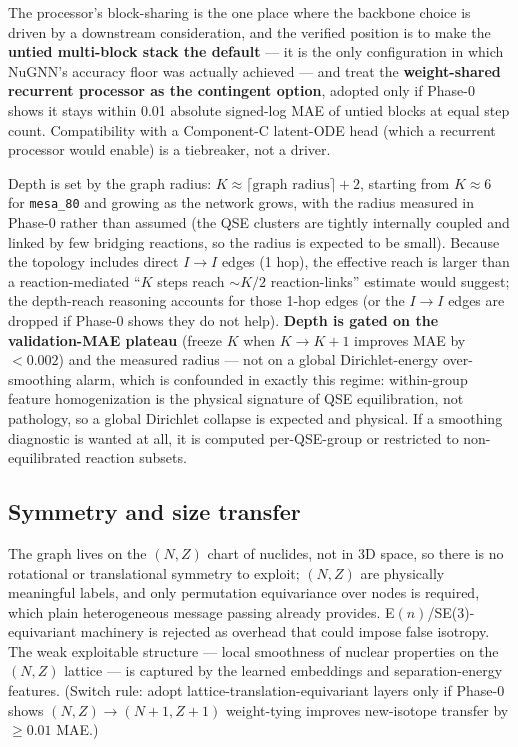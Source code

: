 \documentclass[11pt]{article}
\newcommand{\msn}[1]{\texttt{mesa\_#1}}
\begin{document}
The processor's block-sharing is the one place where the backbone choice is driven by a downstream consideration, and the verified position is to make the \textbf{untied multi-block stack the default} --- it is the only configuration in which NuGNN's accuracy floor was actually achieved --- and treat the \textbf{weight-shared recurrent processor as the contingent option}, adopted only if Phase-0 shows it stays within 0.01 absolute signed-log MAE of untied blocks at equal step count. Compatibility with a Component-C latent-ODE head (which a recurrent processor would enable) is a tiebreaker, not a driver.

Depth is set by the graph radius: $K \approx \lceil\text{graph radius}\rceil + 2$, starting from $K \approx 6$ for \msn{80} and growing as the network grows, with the radius measured in Phase-0 rather than assumed (the QSE clusters are tightly internally coupled and linked by few bridging reactions, so the radius is expected to be small). Because the topology includes direct $I\!\to\!I$ edges (1 hop), the effective reach is larger than a reaction-mediated ``$K$ steps reach $\sim K/2$ reaction-links'' estimate would suggest; the depth-reach reasoning accounts for those 1-hop edges (or the $I\!\to\!I$ edges are dropped if Phase-0 shows they do not help). \textbf{Depth is gated on the validation-MAE plateau} (freeze $K$ when $K\!\to\!K{+}1$ improves MAE by $<0.002$) and the measured radius --- not on a global Dirichlet-energy over-smoothing alarm, which is confounded in exactly this regime: within-group feature homogenization is the physical signature of QSE equilibration, not pathology, so a global Dirichlet collapse is expected and physical. If a smoothing diagnostic is wanted at all, it is computed per-QSE-group or restricted to non-equilibrated reaction subsets.

\subsection{Symmetry and size transfer}

The graph lives on the $(N,Z)$ chart of nuclides, not in 3D space, so there is no rotational or translational symmetry to exploit; $(N,Z)$ are physically meaningful labels, and only permutation equivariance over nodes is required, which plain heterogeneous message passing already provides. E$(n)$/SE(3)-equivariant machinery is rejected as overhead that could impose false isotropy. The weak exploitable structure --- local smoothness of nuclear properties on the $(N,Z)$ lattice --- is captured by the learned embeddings and separation-energy features. (Switch rule: adopt lattice-translation-equivariant layers only if Phase-0 shows $(N,Z)\!\to\!(N{+}1,Z{+}1)$ weight-tying improves new-isotope transfer by $\ge 0.01$ MAE.)
\end{document}
